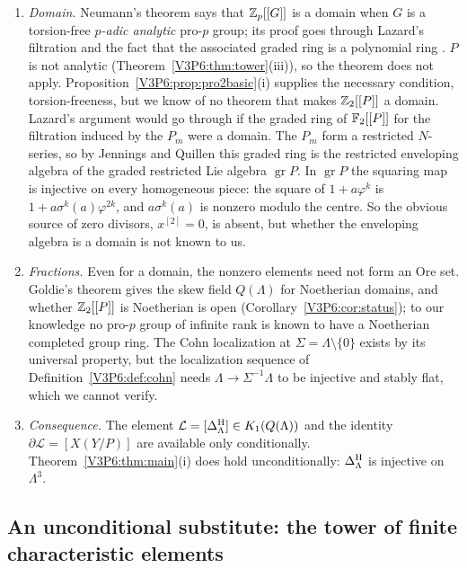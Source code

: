 \begin{remark}\label{V3P6:rem:pro2open}
\begin{enumerate}
\item[(a)] \emph{Domain.} Neumann's theorem \cite{Neu88} says that $\mathbb{Z}_p[[G]]$ is a domain when
$G$ is a torsion-free \emph{$p$-adic analytic} pro-$p$ group; its proof goes through Lazard's
filtration and the fact that the associated graded ring is a polynomial ring \cite{Laz65}. $P$ is
not analytic (Theorem~\ref{V3P6:thm:tower}(iii)), so the theorem does not apply.
Proposition~\ref{V3P6:prop:pro2basic}(i) supplies the necessary condition, torsion-freeness, but
we know of no theorem that makes $\mathbb{Z}_2[[P]]$ a domain. Lazard's argument would go through if the
graded ring of $\mathbb{F}_2[[P]]$ for the filtration induced by the $P_m$ were a domain. The $P_m$ form a
restricted $N$-series, so by Jennings and Quillen this graded ring is the restricted enveloping
algebra of the graded restricted Lie algebra $\operatorname{gr}P$. In $\operatorname{gr}P$ the
squaring map is injective on every homogeneous piece: the square of $1+a\varphi^{k}$ is
$1+a\sigma^{k}(a)\varphi^{2k}$, and $a\sigma^{k}(a)$ is nonzero modulo the centre. So the obvious
source of zero divisors, $x^{[2]}=0$, is absent, but whether the enveloping algebra is a domain is
not known to us.
\item[(b)] \emph{Fractions.} Even for a domain, the nonzero elements need not form an Ore set.
Goldie's theorem gives the skew field $Q(\Lambda)$ for Noetherian domains, and whether
$\mathbb{Z}_2[[P]]$ is Noetherian is open (Corollary~\ref{V3P6:cor:status}); to our knowledge no pro-$p$ group of
infinite rank is known to have a Noetherian completed group ring. The Cohn localization at $\Sigma=\Lambda\setminus\{0\}$
exists by its universal property, but the localization sequence of
Definition~\ref{V3P6:def:cohn} needs $\Lambda\to\Sigma^{-1}\Lambda$ to be injective and stably flat,
which we cannot verify.
\item[(c)] \emph{Consequence.} The element $\mathcal L=[\Delta^{\mathrm{H}}_\Lambda]\in K_1(Q(\Lambda))$ and the
identity $\partial\mathcal L=[X(Y/P)]$ are available only conditionally. Theorem~\ref{V3P6:thm:main}(i)
does hold unconditionally: $\Delta^{\mathrm{H}}_\Lambda$ is injective on $\Lambda^{3}$.
\end{enumerate}
\end{remark}

\subsection*{An unconditional substitute: the tower of finite characteristic elements}

